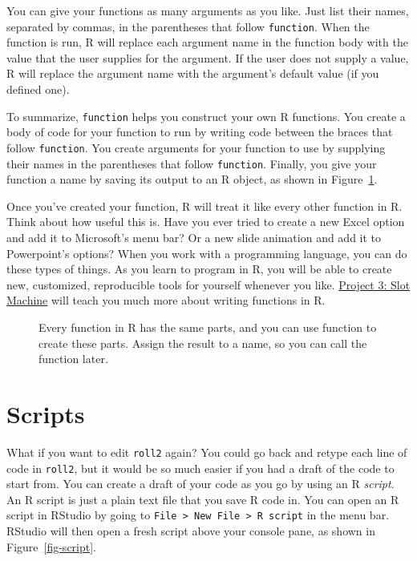\documentclass[
  letterpaper,
  DIV=11,
  numbers=noendperiod]{scrbook}
\makeatletter
\newcommand*\pandocbounded[1]{%
  \sbox\pandoc@box{#1}%
  \Gscale@div\@tempa{\textheight}{\dimexpr\ht\pandoc@box+\dp\pandoc@box\relax}%
  \Gscale@div\@tempb{\linewidth}{\wd\pandoc@box}%
  \ifdim\@tempb\p@<\@tempa\p@\let\@tempa\@tempb\fi%
  \ifdim\@tempa\p@<\p@\scalebox{\@tempa}{\usebox\pandoc@box}%
  \else\usebox{\pandoc@box}%
  \fi%
}
\makeatother
\begin{document}
You can give your functions as many arguments as you like. Just list
their names, separated by commas, in the parentheses that follow
\texttt{function}. When the function is run, R will replace each
argument name in the function body with the value that the user supplies
for the argument. If the user does not supply a value, R will replace
the argument name with the argument's default value (if you defined
one).

To summarize, \texttt{function} helps you construct your own R
functions. You create a body of code for your function to run by writing
code between the braces that follow \texttt{function}. You create
arguments for your function to use by supplying their names in the
parentheses that follow \texttt{function}. Finally, you give your
function a name by saving its output to an R object, as shown in
Figure~\ref{fig-functions}.

Once you've created your function, R will treat it like every other
function in R. Think about how useful this is. Have you ever tried to
create a new Excel option and add it to Microsoft's menu bar? Or a new
slide animation and add it to Powerpoint's options? When you work with a
programming language, you can do these types of things. As you learn to
program in R, you will be able to create new, customized, reproducible
tools for yourself whenever you like. \hyperref[slots]{Project 3: Slot
Machine} will teach you much more about writing functions in R.

\begin{figure}

\centering{

\pandocbounded{\texttt{[image: images/hopr\_0106.png]}}

}

\caption{\label{fig-functions}Every function in R has the same parts,
and you can use function to create these parts. Assign the result to a
name, so you can call the function later.}

\end{figure}%

\section{Scripts}\label{scripts}

What if you want to edit \texttt{roll2} again? You could go back and
retype each line of code in \texttt{roll2}, but it would be so much
easier if you had a draft of the code to start from. You can create a
draft of your code as you go by using an R \emph{script}. An R script is
just a plain text file that you save R code in. You can open an R script
in RStudio by going to
\texttt{File\ \textgreater{}\ New\ File\ \textgreater{}\ R\ script} in
the menu bar. RStudio will then open a fresh script above your console
pane, as shown in Figure~\ref{fig-script}.
\end{document}
